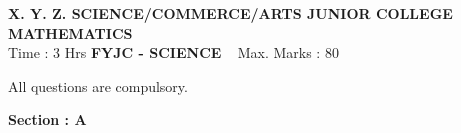 \documentclass[12pt,a4paper]{article}
\begin{document}
\begin{center}
\textbf {X. Y. Z. SCIENCE/COMMERCE/ARTS JUNIOR COLLEGE } \\
\textbf{MATHEMATICS} \\

Time : 3 Hrs \hspace {3.6cm} \textbf {FYJC - SCIENCE}  \hspace{2.9cm} Max. Marks : 80

\end{center}

All questions are compulsory.



\begin{center}

\textbf {Section : A}

\end{center}

\end{document}
